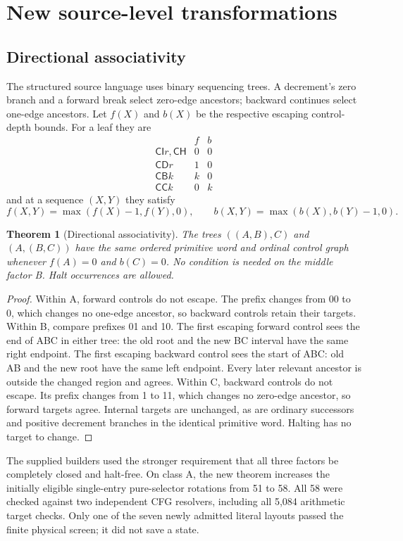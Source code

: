 \documentclass[11pt,a4paper]{article}
\newtheorem{theorem}{Theorem}[section]
\newcommand{\CI}{\mathsf{CI}}
\newcommand{\CD}{\mathsf{CD}}
\newcommand{\CB}{\mathsf{CB}}
\newcommand{\CC}{\mathsf{CC}}
\newcommand{\CH}{\mathsf{CH}}
\begin{document}
\section{New source-level transformations}

\subsection{Directional associativity}

The structured source language uses binary sequencing trees. A decrement's
zero branch and a forward break select zero-edge ancestors; backward
continues select one-edge ancestors. Let $f(X)$ and $b(X)$ be the respective
escaping control-depth bounds. For a leaf they are
\[
\begin{array}{c|cc}
 & f & b\\\hline
\CI r,\CH&0&0\\
\CD r&1&0\\
\CB k&k&0\\
\CC k&0&k
\end{array}
\]
and at a sequence $(X,Y)$ they satisfy
\[
f(X,Y)=\max(f(X)-1,f(Y),0),\qquad
b(X,Y)=\max(b(X),b(Y)-1,0).
\]

\begin{theorem}[Directional associativity]\label{thm:rotation}
The trees $((A,B),C)$ and $(A,(B,C))$ have the same ordered primitive word
and ordinal control graph whenever $f(A)=0$ and $b(C)=0$. No condition is
needed on the middle factor B. Halt occurrences are allowed.
\end{theorem}
\begin{proof}
Within A, forward controls do not escape. The prefix changes from 00 to 0,
which changes no one-edge ancestor, so backward controls retain their
targets. Within B, compare prefixes 01 and 10. The first escaping forward
control sees the end of ABC in either tree: the old root and the new BC
interval have the same right endpoint. The first escaping backward control
sees the start of ABC: old AB and the new root have the same left endpoint.
Every later relevant ancestor is outside the changed region and agrees.
Within C, backward controls do not escape. Its prefix changes from 1 to 11,
which changes no zero-edge ancestor, so forward targets agree. Internal
targets are unchanged, as are ordinary successors and positive decrement
branches in the identical primitive word. Halting has no target to change.
\end{proof}

The supplied builders used the stronger requirement that all three factors
be completely closed and halt-free. On class A, the new theorem increases
the initially eligible single-entry pure-selector rotations from 51 to 58.
All 58 were checked against two independent CFG resolvers, including all
5,084 arithmetic target checks. Only one of the seven newly admitted literal
layouts passed the finite physical screen; it did not save a state.
\end{document}
